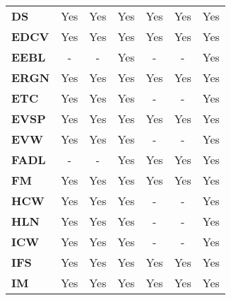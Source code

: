 \begin{table}[ht!]
\begin{tabular}{lcccccc}
\textbf{DS}          & Yes           & Yes                & Yes            & Yes                     & Yes                     & Yes            \\
\textbf{EDCV}        & Yes           & Yes                & Yes            & Yes                     & Yes                     & Yes            \\
\textbf{EEBL}        & -             & -                  & Yes            & -                       & -                       & Yes            \\
\textbf{ERGN}        & Yes           & Yes                & Yes            & Yes                     & Yes                     & Yes            \\
\textbf{ETC}         & Yes           & Yes                & Yes            & -                       & -                       & Yes            \\
\textbf{EVSP}        & Yes           & Yes                & Yes            & Yes                     & Yes                     & Yes            \\
\textbf{EVW}         & Yes           & Yes                & Yes            & -                       & -                       & Yes            \\
\textbf{FADL}        & -             & -                  & Yes            & Yes                     & Yes                     & Yes            \\
\textbf{FM}          & Yes           & Yes                & Yes            & Yes                     & Yes                     & Yes            \\
\textbf{HCW}         & Yes           & Yes                & Yes            & -                       & -                       & Yes            \\
\textbf{HLN}         & Yes           & Yes                & Yes            & -                       & -                       & Yes            \\
\textbf{ICW}         & Yes           & Yes                & Yes            & -                       & -                       & Yes            \\
\textbf{IFS}         & Yes           & Yes                & Yes            & Yes                     & Yes                     & Yes            \\
\textbf{IM}          & Yes           & Yes                & Yes            & Yes                     & Yes                     & Yes            \\

\end{tabular}
\end{table}
